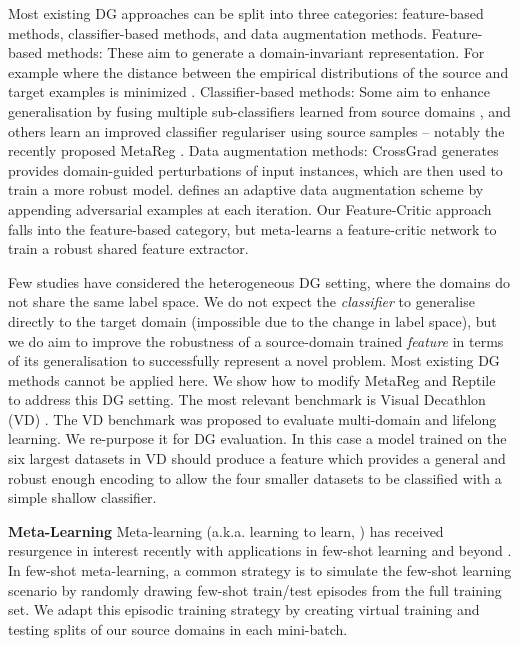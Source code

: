 \documentclass{article}
\newcommand{\cut}[1]{}
\newcommand{\modelname}{Feature-Critic}
\newcommand{\keypoint}[1]{\vspace{0.0cm}\noindent\textbf{#1}\quad}
\begin{document}
Most existing DG approaches can be split into three categories: feature-based methods, classifier-based methods, and data augmentation methods. Feature-based methods: These aim to generate a domain-invariant  representation. For example where the distance between the empirical distributions of the source and target examples is minimized \cite{LiH18, Muandet13,Li18}. Classifier-based methods: Some aim to enhance generalisation by fusing multiple sub-classifiers learned from source domains \cite{Duan12, Niu15, NiuL15}, and others learn an improved classifier regulariser using source samples -- notably the recently proposed MetaReg \cite{Balaji18}. Data augmentation methods: CrossGrad \cite{Shankar18} generates provides domain-guided perturbations of input instances, which are then used to train a more robust model. \citet{Volpi18} defines an adaptive data augmentation scheme by appending adversarial examples at each iteration. Our \modelname{} approach falls into the feature-based category, but meta-learns a feature-critic network to train a robust shared feature extractor.

Few studies have considered the heterogeneous DG setting, where the domains do not share the same label space. We do not expect the \emph{classifier} to generalise directly to the target domain (impossible due to the change in label space), but we do aim to improve the robustness of a source-domain trained \emph{feature} in terms of its generalisation to successfully represent a novel problem. Most existing DG methods cannot be applied here\cut{ besides Domain Adaptive Neural Networks \cite{Ganin16} and CrossGrad \cite{Shankar18}}. We show how to modify MetaReg \cite{Balaji18} and Reptile \cite{nichol2018reptileFOML} to address this DG setting. The most relevant benchmark is Visual Decathlon (VD) \cite{Rebuffi17}. The VD benchmark was proposed to evaluate multi-domain and lifelong \cite{Rosenfeld18} learning. \cut{VD competitors should originally learn a model covering all ten domains, with low parameter growth. } We re-purpose it for DG evaluation. In this case a model trained on the six largest datasets in VD should produce a feature which provides a general and robust enough encoding to allow the four smaller datasets to be classified with a simple shallow classifier.

\keypoint{Meta-Learning} Meta-learning (a.k.a. learning to learn, \cite{schmidhuber1997inductiveBias,thrun1998learntolearn}) has received resurgence in interest recently with applications in few-shot  learning \cite{Li17,snell2017prototypicalNets,Sung18} and beyond \cite{Xu18}. In few-shot meta-learning, a common strategy is to simulate the few-shot learning scenario by randomly drawing few-shot train/test episodes from the full training set. We adapt this episodic training strategy by creating virtual training and testing splits of our source domains in each mini-batch. 
\end{document}
